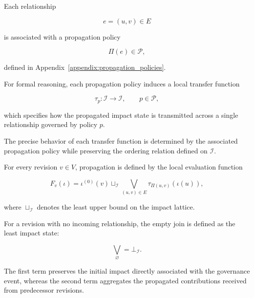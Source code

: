 \documentclass[10pt]{article}
\begin{document}

Each relationship

\[
e=(u,v)\in E
\]

is associated with a propagation policy

\[
\Pi(e)\in\mathcal P,
\]

defined in Appendix~\ref{appendix:propagation_policies}.

For formal reasoning, each propagation policy induces a local transfer function

\begin{equation}
	\tau_p :
	\mathcal I
	\rightarrow
	\mathcal I,
	\qquad
	p\in\mathcal P,
	\label{eq:transfer_function}
\end{equation}

which specifies how the propagated impact state is transmitted across a single
relationship governed by policy $p$.

The precise behavior of each transfer function is determined by the associated
propagation policy while preserving the ordering relation defined on
$\mathcal I$.


For every revision $v\in V$, propagation is defined by the local evaluation
function

\begin{equation}
	\label{eq:local_transfer}
	F_v(\iota)
	=
	\iota^{(0)}(v)
	\sqcup_{\mathcal I}
	\bigvee_{(u,v)\in E}
	\tau_{\Pi(u,v)}
	\!\left(
	\iota(u)
	\right),
\end{equation}

where $\sqcup_{\mathcal I}$ denotes the least upper bound on the impact lattice.

For a revision with no incoming relationship, the empty join is defined as the
least impact state:

\begin{equation}
	\bigvee_{\varnothing}
	=
	\bot_{\mathcal I}.
	\label{eq:empty_impact_join}
\end{equation}

The first term preserves the initial impact directly associated with the
governance event, whereas the second term aggregates the propagated
contributions received from predecessor revisions.

\end{document}
